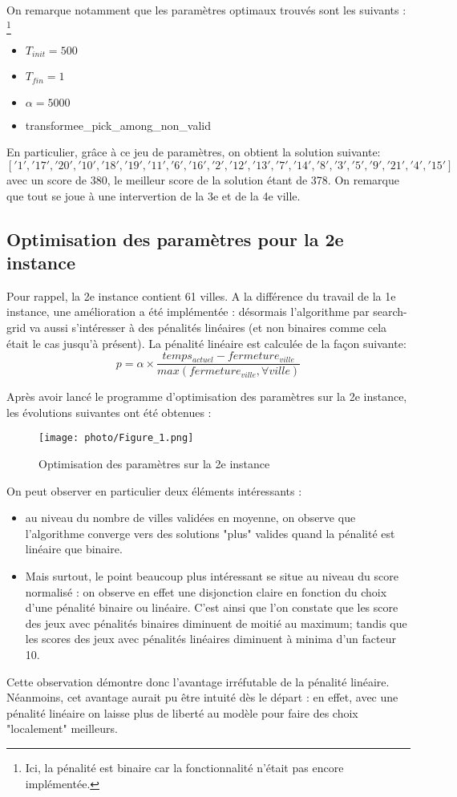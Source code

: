 \documentclass[a4paper, 12pt]{article}
\begin{document}
On remarque notamment que les paramètres optimaux trouvés sont les suivants : \footnote{Ici, la pénalité est binaire car la fonctionnalité n'était pas encore implémentée.}
\begin{itemize}
    \item $T_{init} = 500$
    \item $T_{fin} = 1$
    \item $\alpha = 5000$
    \item transformee\_pick\_among\_non\_valid
\end{itemize}
En particulier, grâce à ce jeu de paramètres, on obtient la solution suivante:
$$['1', '17', '20', '10', '18', '19', '11', '6', '16', '2', '12', '13', '7', '14', '8', '3', '5', '9', '21', '4', '15']$$
avec un score de 380, le meilleur score de la solution étant de 378. On remarque que tout se joue à une intervertion de la 3e et de la 4e ville.

\subsection{Optimisation des paramètres pour la 2e instance}
Pour rappel, la 2e instance contient 61 villes.
A la différence du travail de la 1e instance, une amélioration a été implémentée : désormais l'algorithme par search-grid va aussi s'intéresser à des pénalités linéaires (et non binaires comme cela était le cas jusqu'à présent).
La pénalité linéaire est calculée de la façon suivante:
$$p = \alpha \times \frac{temps_{actuel} - fermeture_{ville}}{max(fermeture_{ville}, \forall ville)}$$

Après avoir lancé le programme d'optimisation des paramètres sur la 2e instance, les évolutions suivantes ont été obtenues :
\begin{figure}[!h]
    \centering
    \texttt{[image: photo/Figure\_1.png]}
    \caption{Optimisation des paramètres sur la 2e instance}
    \label{fig:parametres_2}
\end{figure}

On peut observer en particulier deux éléments intéressants :
\begin{itemize}
    \item au niveau du nombre de villes validées en moyenne, on observe que l'algorithme converge vers des solutions "plus" valides quand la pénalité est linéaire que binaire.
    \item Mais surtout, le point beaucoup plus intéressant se situe au niveau du score normalisé : on observe en effet une disjonction claire en fonction du choix d'une pénalité binaire ou linéaire.
    C'est ainsi que l'on constate que les score des jeux avec pénalités binaires diminuent de moitié au maximum; tandis que les scores des jeux avec pénalités linéaires diminuent à minima d'un facteur 10.
\end{itemize}
Cette observation démontre donc l'avantage irréfutable de la pénalité linéaire. Néanmoins, cet avantage aurait pu être intuité dès le départ : en effet, avec une pénalité linéaire on laisse plus de liberté au modèle pour faire des choix "localement" meilleurs.
\end{document}

